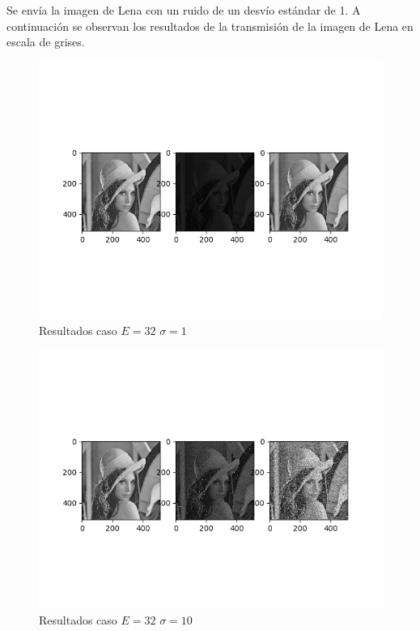 Se env\'ia la imagen de Lena con un ruido de un desv\'io est\'andar de 1. A continuaci\'on se observan los resultados de la transmisi\'on de la imagen de Lena en escala de grises.
 
 
\begin{figure}
\includegraphics[scale=0.9]{Imagenes/E32S01}
\centering
\caption{Resultados caso $E=32$ $\sigma = 1$ }
\end{figure}
 
\begin{figure}
\includegraphics[scale=0.9]{Imagenes/E32S10}
\centering
\caption{Resultados caso $E=32$ $\sigma = 10$ }
\end{figure}

